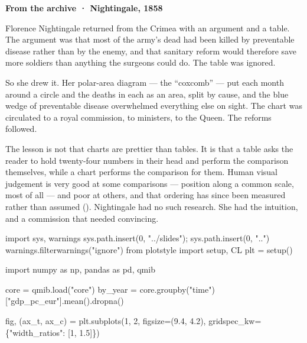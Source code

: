 \documentclass[
  letterpaper,
  10pt,
  twoside,
  openright,
  numbers=noenddot,
  chapterprefix=true]{scrbook}
\newenvironment{Shaded}{}{}
\newcommand{\DecValTok}[1]{\textcolor[rgb]{0.00,0.36,0.77}{#1}}
\newcommand{\FloatTok}[1]{\textcolor[rgb]{0.00,0.36,0.77}{#1}}
\newcommand{\ImportTok}[1]{\textcolor[rgb]{0.01,0.18,0.38}{#1}}
\newcommand{\NormalTok}[1]{\textcolor[rgb]{0.14,0.16,0.18}{#1}}
\newcommand{\OperatorTok}[1]{\textcolor[rgb]{0.14,0.16,0.18}{#1}}
\newcommand{\StringTok}[1]{\textcolor[rgb]{0.01,0.18,0.38}{#1}}
\newenvironment{qmibarchive}
  {\par\medskip\noindent{\color{econgold}\rule{\linewidth}{1.4pt}}%
   \par\nobreak\vspace{4pt}\noindent\ignorespaces}
  {\par\vspace{2pt}\noindent{\color{econrule}\rule{\linewidth}{0.4pt}}\par\medskip}
\begin{document}
\begin{qmibarchive}

\textbf{From the archive · Nightingale, 1858}

Florence Nightingale returned from the Crimea with an argument and a
table. The argument was that most of the army's dead had been killed by
preventable disease rather than by the enemy, and that sanitary reform
would therefore save more soldiers than anything the surgeons could do.
The table was ignored.

So she drew it. Her polar-area diagram --- the ``coxcomb'' --- put each
month around a circle and the deaths in each as an area, split by cause,
and the blue wedge of preventable disease overwhelmed everything else on
sight. The chart was circulated to a royal commission, to ministers, to
the Queen. The reforms followed.

The lesson is not that charts are prettier than tables. It is that a
table asks the reader to hold twenty-four numbers in their head and
perform the comparison themselves, while a chart performs the comparison
for them. Human visual judgement is very good at some comparisons ---
position along a common scale, most of all --- and poor at others, and
that ordering has since been measured rather than assumed
(). Nightingale
had no such research. She had the intuition, and a commission that
needed convincing.

\begin{Shaded}
\begin{Highlighting}[]
\ImportTok{import}\NormalTok{ sys, warnings}
\NormalTok{sys.path.insert(}\DecValTok{0}\NormalTok{, }\StringTok{"../slides"}\NormalTok{)}\OperatorTok{;}\NormalTok{ sys.path.insert(}\DecValTok{0}\NormalTok{, }\StringTok{".."}\NormalTok{)}
\NormalTok{warnings.filterwarnings(}\StringTok{"ignore"}\NormalTok{)}
\ImportTok{from}\NormalTok{ plotstyle }\ImportTok{import}\NormalTok{ setup, CL}
\NormalTok{plt }\OperatorTok{=}\NormalTok{ setup()}

\ImportTok{import}\NormalTok{ numpy }\ImportTok{as}\NormalTok{ np, pandas }\ImportTok{as}\NormalTok{ pd, qmib}

\NormalTok{core }\OperatorTok{=}\NormalTok{ qmib.load(}\StringTok{"core"}\NormalTok{)}
\NormalTok{by\_year }\OperatorTok{=}\NormalTok{ core.groupby(}\StringTok{"time"}\NormalTok{)[}\StringTok{"gdp\_pc\_eur"}\NormalTok{].mean().dropna()}

\NormalTok{fig, (ax\_t, ax\_c) }\OperatorTok{=}\NormalTok{ plt.subplots(}\DecValTok{1}\NormalTok{, }\DecValTok{2}\NormalTok{, figsize}\OperatorTok{=}\NormalTok{(}\FloatTok{9.4}\NormalTok{, }\FloatTok{4.2}\NormalTok{),}
\NormalTok{                                 gridspec\_kw}\OperatorTok{=}\NormalTok{\{}\StringTok{"width\_ratios"}\NormalTok{: [}\DecValTok{1}\NormalTok{, }\FloatTok{1.5}\NormalTok{]\})}


\end{Highlighting}
\end{Shaded}
\end{qmibarchive}
\end{document}
